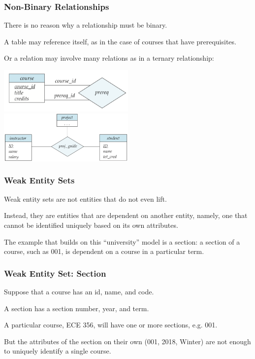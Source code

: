 \begin{frame}
\frametitle{Non-Binary Relationships}

There is no reason why a relationship must be binary.

A table may reference itself, as in the case of courses that have prerequisites.

Or a relation may involve many relations as in a ternary relationship:

\begin{center}
\includegraphics[width=0.5\textwidth]{images/prereq}\\
\includegraphics[width=0.5\textwidth]{images/er-ternary}
\end{center}

\end{frame}



\begin{frame}
\frametitle{Weak Entity Sets}

Weak entity sets are not entities that do not even lift. 

Instead, they are entities that are dependent on another entity, namely, one that cannot be identified uniquely based on its own attributes. 

The example that builds on this ``university'' model is a section: a section of a course, such as 001, is dependent on a course in a particular term. 

\end{frame}


\begin{frame}
\frametitle{Weak Entity Set: Section}

Suppose that a course has an id, name, and code. 

A section has a section number, year, and term. 

A particular course, ECE 356, will have one or more sections, e.g. 001. 

But the attributes of the section on their own (001, 2018, Winter) are not enough to uniquely identify a single course. 

\end{frame}

